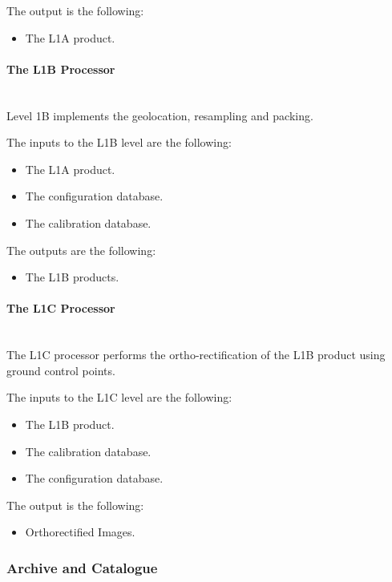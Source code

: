 The output is the following:
\begin{itemize}
\item The L1A product.
\end{itemize}

\paragraph{The L1B Processor}~\\

Level 1B implements the geolocation, resampling and packing.

The inputs to the L1B level are the following:
\begin{itemize}
\item The L1A product.
\item The configuration database.
\item The calibration database.
\end{itemize}

The outputs are the following:
\begin{itemize}
\item The L1B products.
\end{itemize}


\paragraph{The L1C Processor}~\\

The L1C processor performs the ortho-rectification of the L1B product using ground control points.

The inputs to the L1C level are the following:
\begin{itemize}
\item The L1B  product.
\item The calibration database.
\item The configuration database.
\end{itemize}

The output is the following:
\begin{itemize}
\item Orthorectified Images.
\end{itemize}




\subsubsection{Archive and Catalogue}
\label{sub:archive}

